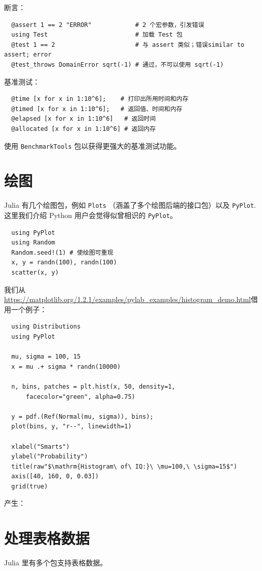 \documentclass[10pt,a4paper]{article}
\begin{document}
断言：
\begin{lstlisting}
  @assert 1 == 2 "ERROR"            # 2 个宏参数，引发错误
  using Test                        # 加载 Test 包
  @test 1 == 2                      # 与 assert 类似；错误similar to assert; error
  @test_throws DomainError sqrt(-1) # 通过，不可以使用 sqrt(-1)
\end{lstlisting}

基准测试：
\begin{lstlisting}
  @time [x for x in 1:10^6];    # 打印出所用时间和内存
  @timed [x for x in 1:10^6];   # 返回值、时间和内存
  @elapsed [x for x in 1:10^6]   # 返回时间
  @allocated [x for x in 1:10^6] # 返回内存
\end{lstlisting}
使用 \lstinline|BenchmarkTools| 包以获得更强大的基准测试功能。

\section{绘图}
Julia 有几个绘图包，例如 \lstinline|Plots| （涵盖了多个绘图后端的接口包）以及 \lstinline|PyPlot|.
这里我们介绍 Python 用户会觉得似曾相识的 \lstinline|PyPlot|。
\begin{lstlisting}
  using PyPlot
  using Random
  Random.seed!(1) # 使绘图可重现
  x, y = randn(100), randn(100)
  scatter(x, y)
\end{lstlisting}

我们从\url{https://matplotlib.org/1.2.1/examples/pylab_examples/histogram_demo.html}借用一个例子：
\begin{lstlisting}
  using Distributions
  using PyPlot

  mu, sigma = 100, 15
  x = mu .+ sigma * randn(10000)

  n, bins, patches = plt.hist(x, 50, density=1,
      facecolor="green", alpha=0.75)

  y = pdf.(Ref(Normal(mu, sigma)), bins);
  plot(bins, y, "r--", linewidth=1)

  xlabel("Smarts")
  ylabel("Probability")
  title(raw"$\mathrm{Histogram\ of\ IQ:}\ \mu=100,\ \sigma=15$")
  axis([40, 160, 0, 0.03])
  grid(true)
\end{lstlisting}

产生：


\section{处理表格数据}

Julia 里有多个包支持表格数据。
\end{document}
